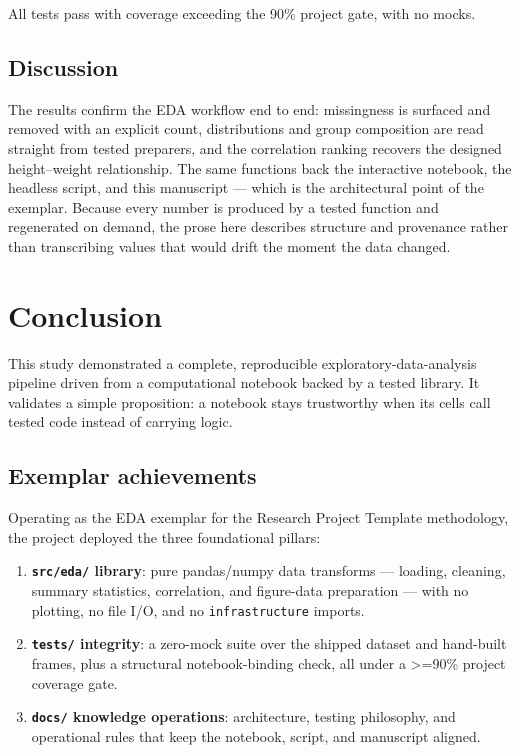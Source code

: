 \documentclass[
]{article}
\providecommand{\tightlist}{%
  \setlength{\itemsep}{0pt}\setlength{\parskip}{0pt}}
\begin{document}
All tests pass with coverage exceeding the 90\% project gate, with no
mocks.

\subsection{Discussion}\label{discussion}

The results confirm the EDA workflow end to end: missingness is surfaced
and removed with an explicit count, distributions and group composition
are read straight from tested preparers, and the correlation ranking
recovers the designed height--weight relationship. The same functions
back the interactive notebook, the headless script, and this manuscript
--- which is the architectural point of the exemplar. Because every
number is produced by a tested function and regenerated on demand, the
prose here describes structure and provenance rather than transcribing
values that would drift the moment the data changed.

\newpage

\section{Conclusion}\label{sec:conclusion}

This study demonstrated a complete, reproducible
exploratory-data-analysis pipeline driven from a computational notebook
backed by a tested library. It validates a simple proposition: a
notebook stays trustworthy when its cells call tested code instead of
carrying logic.

\subsection{Exemplar achievements}\label{exemplar-achievements}

Operating as the EDA exemplar for the Research Project Template
methodology, the project deployed the three foundational pillars:

\begin{enumerate}
\def\labelenumi{\arabic{enumi}.}
\tightlist
\item
  \textbf{\texttt{src/eda/} library}: pure pandas/numpy data transforms
  --- loading, cleaning, summary statistics, correlation, and
  figure-data preparation --- with no plotting, no file I/O, and no
  \texttt{infrastructure} imports.
\item
  \textbf{\texttt{tests/} integrity}: a zero-mock suite over the shipped
  dataset and hand-built frames, plus a structural notebook-binding
  check, all under a \texorpdfstring{\textgreater{}=}{>=}90\% project coverage gate.
\item
  \textbf{\texttt{docs/} knowledge operations}: architecture, testing
  philosophy, and operational rules that keep the notebook, script, and
  manuscript aligned.
\end{enumerate}
\end{document}
